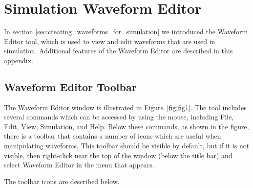 \documentclass[11pt, twoside, pdftex]{article}
\begin{document}
\newpage
\appendix
\setcounter{figure}{0}
\setcounter{table}{0}

\section{Simulation Waveform Editor}
In section \ref{sec:creating_waveforms_for_simulation} we introduced the Waveform Editor tool, which is used to view and edit waveforms 
that are used in simulation. Additional features of the Waveform Editor are described in this appendix.

\subsection{Waveform Editor Toolbar}
The Waveform Editor window is illustrated in Figure~\ref{fig:fig1}. The tool includes several commands 
which can be accessed by using the mouse, including {\sf File}, {\sf Edit}, {\sf View}, {\sf Simulation}, and {\sf Help}. 
Below these commands, as shown in the figure, there is a toolbar that contains a number of icons which are useful when manipulating waveforms. 
This toolbar should be visible by default, but if it is not visible, then right-click near the top of the window 
(below the title bar) and select {\sf Waveform Editor} in the menu that appears.

The toolbar icons are described below.
\end{document}
